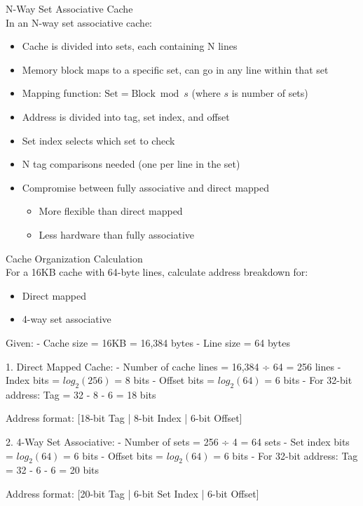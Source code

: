 \begin{concept}{N-Way Set Associative Cache}\\
In an N-way set associative cache:
\begin{itemize}
    \item Cache is divided into sets, each containing N lines
    \item Memory block maps to a specific set, can go in any line within that set
    \item Mapping function: $\text{Set} = \text{Block} \bmod s$ (where $s$ is number of sets)
    \item Address is divided into tag, set index, and offset
    \item Set index selects which set to check
    \item N tag comparisons needed (one per line in the set)
    \item Compromise between fully associative and direct mapped
    \begin{itemize}
        \item More flexible than direct mapped
        \item Less hardware than fully associative
    \end{itemize}
\end{itemize}
\end{concept}

\begin{example2}{Cache Organization Calculation}\\
For a 16KB cache with 64-byte lines, calculate address breakdown for:
\begin{itemize}
\item Direct mapped
\item 4-way set associative
\end{itemize}
\tcblower
Given:
- Cache size = 16KB = 16,384 bytes
- Line size = 64 bytes

1. Direct Mapped Cache:
   - Number of cache lines = 16,384 ÷ 64 = 256 lines
   - Index bits = $log_2(256)$ = 8 bits
   - Offset bits = $log_2(64)$ = 6 bits
   - For 32-bit address: Tag = 32 - 8 - 6 = 18 bits
   
   Address format: [18-bit Tag | 8-bit Index | 6-bit Offset]

2. 4-Way Set Associative:
   - Number of sets = 256 ÷ 4 = 64 sets
   - Set index bits = $log_2(64)$ = 6 bits
   - Offset bits = $log_2(64)$ = 6 bits
   - For 32-bit address: Tag = 32 - 6 - 6 = 20 bits
   
   Address format: [20-bit Tag | 6-bit Set Index | 6-bit Offset]
\end{example2}

